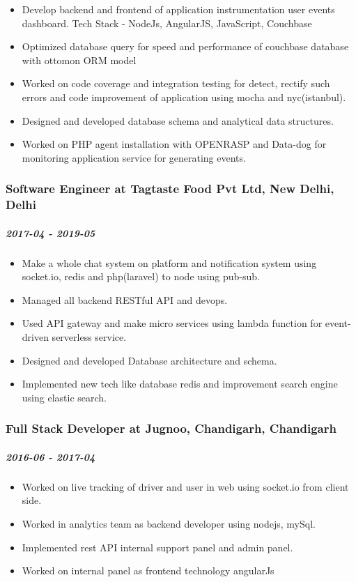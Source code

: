 \begin{itemize}
\itemsep1pt\parskip0pt
\item
  Develop backend and frontend of application instrumentation user
  events dashboard. Tech Stack - NodeJs, AngularJS, JavaScript,
  Couchbase
\item
  Optimized database query for speed and performance of couchbase
  database with ottomon ORM model
\item
  Worked on code coverage and integration testing for detect, rectify
  such errors and code improvement of application using mocha and
  nyc(istanbul).
\item
  Designed and developed database schema and analytical data structures.
\item
  Worked on PHP agent installation with OPENRASP and Data-dog for
  monitoring application service for generating events.
\end{itemize}

\subsubsection{Software Engineer at Tagtaste Food Pvt Ltd, New Delhi,
Delhi}

\subparagraph{2017-04 - 2019-05}

\begin{itemize}
\itemsep1pt\parskip0pt
\item
  Make a whole chat system on platform and notification system using
  socket.io, redis and php(laravel) to node using pub-sub.
\item
  Managed all backend RESTful API and devops.
\item
  Used API gateway and make micro services using lambda function for
  event-driven serverless service.
\item
  Designed and developed Database architecture and schema.
\item
  Implemented new tech like database redis and improvement search engine
  using elastic search.
\end{itemize}

\subsubsection{Full Stack Developer at Jugnoo, Chandigarh, Chandigarh}

\subparagraph{2016-06 - 2017-04}

\begin{itemize}
\itemsep1pt\parskip0pt
\item
  Worked on live tracking of driver and user in web using socket.io from
  client side.
\item
  Worked in analytics team as backend developer using nodejs, mySql.
\item
  Implemented rest API internal support panel and admin panel.
\item
  Worked on internal panel as frontend technology angularJs
\end{itemize}


